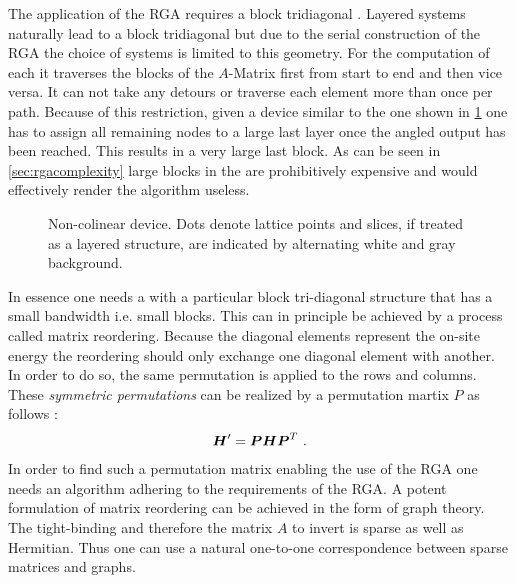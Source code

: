 The application of the RGA requires a block tridiagonal \hamil{}. Layered systems naturally lead to a block tridiagonal \hamil{} but due to the serial construction of the RGA the choice of systems is limited to this geometry. For the computation of each \gfnc{} it traverses the blocks of the $A$-Matrix first from start to end and then vice versa. It can not take any detours or traverse each element more than once per path. Because of this restriction, given a device similar to the one shown in \cref{fig:noncolinear} one has to assign all remaining nodes to a large last layer once the angled output has been reached. This results in a very large last block. As can be seen in \cref{sec:rgacomplexity} large blocks in the \hamil{} are prohibitively expensive and would effectively render the algorithm useless.
\begin{figure}[!ht]
\centering
{}
\caption{Non-colinear device. Dots denote lattice points and slices, if treated as a layered structure, are indicated by alternating white and gray background.}
\label{fig:noncolinear}
\end{figure}
In essence one needs a \hamil{} with a particular block tri-diagonal structure that has a small bandwidth i.e. small blocks. This can in principle be achieved by a process called matrix reordering. Because the diagonal elements represent the on-site energy the reordering should only exchange one diagonal element with another. In order to do so, the same permutation is applied to the rows and columns. These \emph{symmetric permutations} can be realized by a permutation martix $P$ as follows \cite{saad2003iterative}:
\begin{align}
\boldsymbol{H}' = \boldsymbol{P} \boldsymbol{H} \boldsymbol{P}^{T}\ .
\label{eqn:permutation}
\end{align}
In order to find such a permutation matrix enabling the use of the RGA one needs an algorithm adhering to the requirements of the RGA.
A potent formulation of matrix reordering can be achieved in the form of graph theory. The tight-binding \hamil{} and therefore the matrix $A$ to invert is sparse as well as Hermitian. Thus one can use a natural one-to-one correspondence between sparse matrices and graphs.

